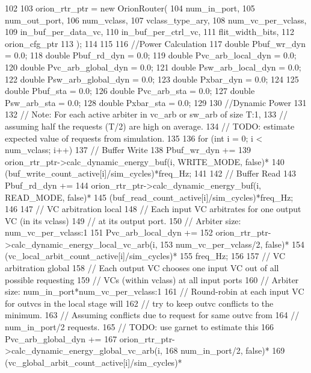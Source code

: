 \begin{DoxyCode}
{102 
103     orion_rtr_ptr = new OrionRouter(
104         num_in_port,
105         num_out_port,
106         num_vclass,
107         vclass_type_ary,
108         num_vc_per_vclass,
109         in_buf_per_data_vc,
110         in_buf_per_ctrl_vc,
111         flit_width_bits,
112         orion_cfg_ptr
113     );
114 
115 
116     //Power Calculation
117     double Pbuf_wr_dyn = 0.0;
118     double Pbuf_rd_dyn = 0.0;
119     double Pvc_arb_local_dyn = 0.0;
120     double Pvc_arb_global_dyn = 0.0;
121     double Psw_arb_local_dyn = 0.0;
122     double Psw_arb_global_dyn = 0.0;
123     double Pxbar_dyn = 0.0;
124 
125     double Pbuf_sta = 0.0;
126     double Pvc_arb_sta = 0.0;
127     double Psw_arb_sta = 0.0;
128     double Pxbar_sta = 0.0;
129 
130     //Dynamic Power
131 
132     // Note: For each active arbiter in vc_arb or sw_arb of size T:1,
133     // assuming half the requests (T/2) are high on average.
134     // TODO: estimate expected value of requests from simulation.
135 
136     for (int i = 0; i < num_vclass; i++) {
137         // Buffer Write
138         Pbuf_wr_dyn +=
139             orion_rtr_ptr->calc_dynamic_energy_buf(i, WRITE_MODE, false)*
140                 (buf_write_count_active[i]/sim_cycles)*freq_Hz;
141 
142         // Buffer Read
143         Pbuf_rd_dyn +=
144             orion_rtr_ptr->calc_dynamic_energy_buf(i, READ_MODE, false)*
145                 (buf_read_count_active[i]/sim_cycles)*freq_Hz;
146 
147         // VC arbitration local
148         // Each input VC arbitrates for one output VC (in its vclass)
149         // at its output port.
150         // Arbiter size: num_vc_per_vclass:1
151         Pvc_arb_local_dyn +=
152             orion_rtr_ptr->calc_dynamic_energy_local_vc_arb(i,
153                 num_vc_per_vclass/2, false)*
154                     (vc_local_arbit_count_active[i]/sim_cycles)*
155                     freq_Hz;
156 
157         // VC arbitration global
158         // Each output VC chooses one input VC out of all possible requesting
159         // VCs (within vclass) at all input ports
160         // Arbiter size: num_in_port*num_vc_per_vclass:1
161         // Round-robin at each input VC for outvcs in the local stage will
162         // try to keep outvc conflicts to the minimum.
163         // Assuming conflicts due to request for same outvc from
164         // num_in_port/2 requests.
165         // TODO: use garnet to estimate this
166         Pvc_arb_global_dyn +=
167             orion_rtr_ptr->calc_dynamic_energy_global_vc_arb(i,
168                 num_in_port/2, false)*
169                     (vc_global_arbit_count_active[i]/sim_cycles)*
}}
\end{DoxyCode}
